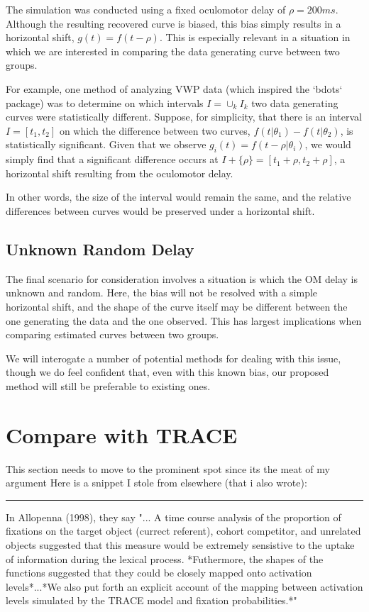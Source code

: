 \documentclass{article}
\begin{document}
The simulation was conducted using a fixed oculomotor delay of $\rho = 200ms$. Although the resulting recovered curve is biased, this bias simply results in a horizontal shift, $g(t) = f(t - \rho)$. This is especially relevant in a situation in which we are interested in comparing the data generating curve between two groups. 

For example, one method of analyzing VWP data (which inspired the `bdots` package) was to determine on which intervals $I = \cup_{k} I_k$ two data generating curves were statistically different. Suppose, for simplicity, that there is an interval $I = [t_1, t_2]$ on which the difference between two curves, $f(t | \theta_1) - f(t|\theta_2)$, is statistically significant. Given that we observe $g_i(t) = f(t - \rho | \theta_i)$, we would simply find that a significant difference occurs at $I + \{\rho\} = [t_1 + \rho, t_2 + \rho]$, a horizontal shift resulting from the oculomotor delay.

In other words, the size of the interval would remain the same, and the relative differences between curves would be preserved under a horizontal shift. 

\subsection{Unknown Random Delay}


The final scenario for consideration involves a situation is which the OM delay is unknown and random. Here, the bias will not be resolved with a simple horizontal shift, and the shape of the curve itself may be different between the one generating the data and the one observed. This has largest implications when comparing estimated curves between two groups.

We will interogate a number of potential methods for dealing with this issue, though we do feel confident that, even with this known bias, our proposed method will still be preferable to existing ones. 

\section{Compare with TRACE}

This section needs to move to the prominent spot since its the meat of my argument 
Here is a snippet I stole from elsewhere (that i also wrote):

\noindent\rule{2cm}{0.4pt}

In Allopenna (1998), they say "... A time course analysis of the proportion of fixations on the target object (currect referent), cohort competitor, and unrelated objects suggested that this measure would be extremely sensistive to the uptake of information during the lexical process. *Futhermore, the shapes of the functions suggested that they could be closely mapped onto activation levels*...*We also put forth an explicit account of the mapping between activation levels simulated by the TRACE model and fixation probabilities.*"
\end{document}
